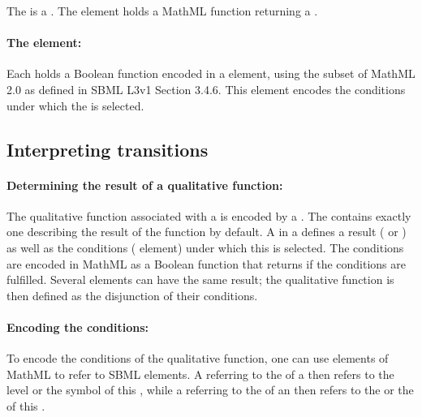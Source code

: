 The  is a . The element  holds a MathML function returning a . 

\paragraph{The  element:}
Each  holds a Boolean function encoded in a  element, using the subset of MathML 2.0 as defined in SBML L3v1 Section 3.4.6.
This element encodes the conditions under which the  is selected.


\bigskip
\subsection*{\hypertarget{inter_trans}{Interpreting transitions}} %

\paragraph{Determining the result of a qualitative function:}
The qualitative function associated with a  is encoded by a . The  contains exactly one  describing the result of the function by default. A  in a  defines a result ( or ) as well as the conditions ( element) under which this  is selected.
The conditions are encoded in MathML as a Boolean function that returns  if the conditions are fulfilled.
Several  elements can have the same result; the qualitative function is then defined as the disjunction of their conditions. 

\paragraph{Encoding the conditions:}
To encode the conditions of the qualitative function, one can use  elements of MathML to refer to SBML elements. A  referring to the  of a  then refers to the level or the symbol of this , while a  referring to the  of an  then refers to the  or the  of this .


